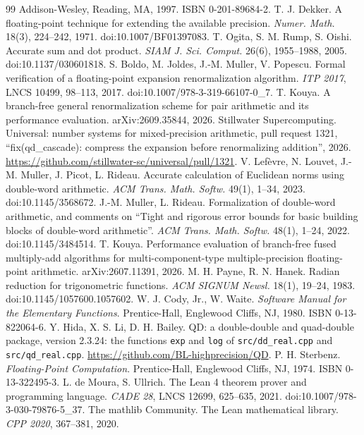 \documentclass[conference]{IEEEtran}
\theoremstyle{definition}
\theoremstyle{remark}
\begin{document}
\begin{thebibliography}{99}
Addison-Wesley, Reading, MA, 1997. ISBN 0-201-89684-2.
 T. J. Dekker. A floating-point technique for extending the available precision. \emph{Numer.
Math.} 18(3), 224--242, 1971. doi:10.1007/BF01397083.
 T. Ogita, S. M. Rump, S. Oishi. Accurate sum and dot product. \emph{SIAM J. Sci. Comput.} 26(6),
1955--1988, 2005. doi:10.1137/030601818.
 S. Boldo, M. Joldes, J.-M. Muller, V. Popescu. Formal verification of a floating-point expansion
renormalization algorithm. \emph{ITP 2017}, LNCS 10499, 98--113, 2017. doi:10.1007/978-3-319-66107-0\_7.
 T. Kouya. A branch-free general renormalization scheme for pair arithmetic and its performance
evaluation. arXiv:2609.35844, 2026.
 Stillwater Supercomputing. Universal: number systems for mixed-precision arithmetic, pull request
1321, ``fix(qd\_cascade): compress the expansion before renormalizing addition'', 2026.
\url{https://github.com/stillwater-sc/universal/pull/1321}.
 V. Lef\`evre, N. Louvet, J.-M. Muller, J. Picot, L. Rideau. Accurate calculation of Euclidean
norms using double-word arithmetic. \emph{ACM Trans. Math. Softw.} 49(1), 1--34, 2023. doi:10.1145/3568672.
 J.-M. Muller, L. Rideau. Formalization of double-word arithmetic, and comments on ``Tight and rigorous
error bounds for basic building blocks of double-word arithmetic''. \emph{ACM Trans. Math. Softw.} 48(1), 1--24, 2022.
doi:10.1145/3484514.
 T. Kouya. Performance evaluation of branch-free fused multiply-add algorithms for
multi-component-type multiple-precision floating-point arithmetic. arXiv:2607.11391, 2026.
 M. H. Payne, R. N. Hanek. Radian reduction for trigonometric functions. \emph{ACM SIGNUM Newsl.}
18(1), 19--24, 1983. doi:10.1145/1057600.1057602.
 W. J. Cody, Jr., W. Waite. \emph{Software Manual for the Elementary Functions}. Prentice-Hall,
Englewood Cliffs, NJ, 1980. ISBN 0-13-822064-6.
 Y. Hida, X. S. Li, D. H. Bailey. QD: a double-double and quad-double package, version 2.3.24: the
functions \texttt{exp} and \texttt{log} of \texttt{src/dd\_real.cpp} and \texttt{src/qd\_real.cpp}.
\url{https://github.com/BL-highprecision/QD}.
 P. H. Sterbenz. \emph{Floating-Point Computation}. Prentice-Hall, Englewood Cliffs, NJ, 1974.
ISBN 0-13-322495-3.
 L. de Moura, S. Ullrich. The Lean 4 theorem prover and programming language. \emph{CADE 28}, LNCS
12699, 625--635, 2021. doi:10.1007/978-3-030-79876-5\_37.
 The mathlib Community. The Lean mathematical library. \emph{CPP 2020}, 367--381, 2020.

\end{thebibliography}
\end{document}
